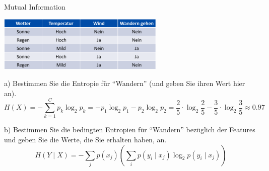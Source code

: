 \begin{example}{Mutual Information}
    \begin{center}
        \includegraphics[width=0.6\textwidth]{includes/figures/example_information_gain.png}
    \end{center}



    a) Bestimmen Sie die Entropie für \enquote{Wandern} (und geben Sie ihren Wert hier an).
    \[
        H(X) = - \sum_{k=1}^{C} p_k \log_2 p_k = - p_1 \log_2 p_1 - p_2 \log_2 p_2 = \frac{2}{5} \cdot \log_2 \frac{2}{5} - \frac{3}{5} \cdot \log_2 \frac{3}{5} \approx 0.97
    \]

    b) Bestimmen Sie die bedingten Entropien für \enquote{Wandern} bezüglich der Features und geben Sie die Werte, die Sie erhalten haben, an.
    \[
        H(Y \mid X) = - \sum_j p(x_j) \left( \sum_i p(y_i \mid x_j) \log_2 p(y_i \mid x_j) \right)
    \]


\end{example}

